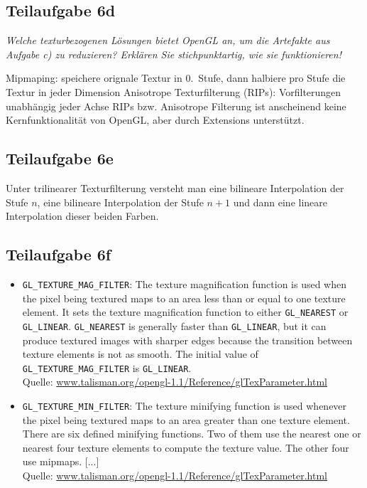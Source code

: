 \documentclass[a4paper]{scrartcl}
\begin{document}
\subsection*{Teilaufgabe 6d}
\textit{Welche texturbezogenen Lösungen bietet OpenGL an, um die Artefakte aus
Aufgabe c) zu reduzieren? Erklären Sie stichpunktartig, wie sie funktionieren!}

Mipmaping: speichere orignale Textur in 0.~Stufe, dann halbiere pro Stufe die
Textur in jeder Dimension Anisotrope Texturfilterung (RIPs): Vorfilterungen
unabhängig jeder Achse RIPs bzw. Anisotrope Filterung ist anscheinend keine
Kernfunktionalität von OpenGL, aber durch Extensions unterstützt.

\subsection*{Teilaufgabe 6e}
Unter trilinearer Texturfilterung versteht man eine bilineare Interpolation
der Stufe $n$, eine bilineare Interpolation der Stufe $n+1$ und dann eine
lineare Interpolation dieser beiden Farben.

\subsection*{Teilaufgabe 6f}
\begin{itemize}
    \item \texttt{GL\_TEXTURE\_MAG\_FILTER}: The texture magnification function
    is used when the pixel being textured maps to an area less than or equal to
    one texture element. It sets the texture magnification function to either
    \texttt{GL\_NEAREST} or \texttt{GL\_LINEAR}. \texttt{GL\_NEAREST} is
    generally faster than
    \texttt{GL\_LINEAR}, but it can produce textured images with sharper edges
    because the transition between texture elements is not as smooth. The
    initial value of \texttt{GL\_TEXTURE\_MAG\_FILTER} is \texttt{GL\_LINEAR}.\\
    Quelle: \href{https://www.talisman.org/opengl-1.1/Reference/glTexParameter.html}{www.talisman.org/opengl-1.1/Reference/glTexParameter.html}
    \item \texttt{GL\_TEXTURE\_MIN\_FILTER}: The texture minifying function is used whenever the pixel being textured maps to an area greater than one texture element. There are six defined minifying functions. Two of them use the nearest one or nearest four texture elements to compute the texture value. The other four use mipmaps. [...]\\
    Quelle: \href{https://www.talisman.org/opengl-1.1/Reference/glTexParameter.html}{www.talisman.org/opengl-1.1/Reference/glTexParameter.html}
\end{itemize}
\end{document}

